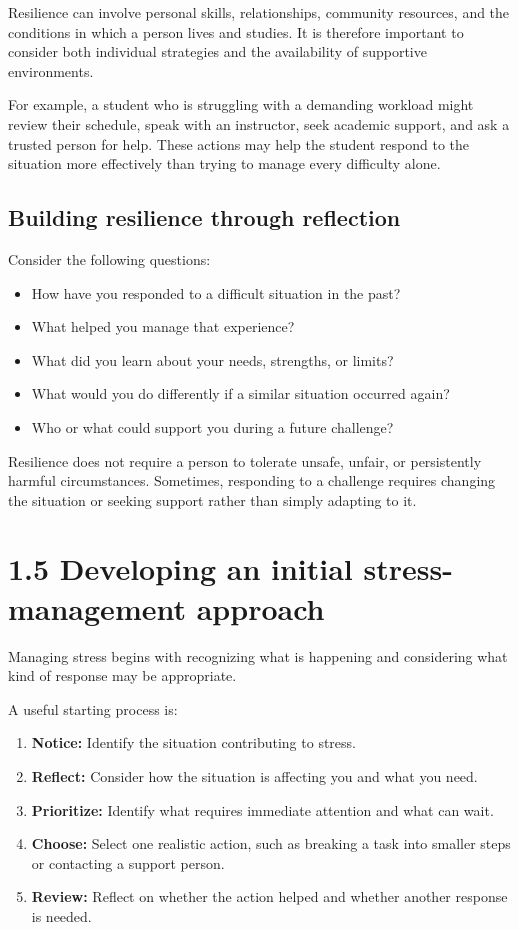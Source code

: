 \documentclass[
  letterpaper,
]{book}
\providecommand{\tightlist}{%
  \setlength{\itemsep}{0pt}\setlength{\parskip}{0pt}}
\begin{document}
Resilience can involve personal skills, relationships, community
resources, and the conditions in which a person lives and studies. It is
therefore important to consider both individual strategies and the
availability of supportive environments.

For example, a student who is struggling with a demanding workload might
review their schedule, speak with an instructor, seek academic support,
and ask a trusted person for help. These actions may help the student
respond to the situation more effectively than trying to manage every
difficulty alone.

\subsection{Building resilience through
reflection}\label{building-resilience-through-reflection}

Consider the following questions:

\begin{itemize}
\tightlist
\item
  How have you responded to a difficult situation in the past?
\item
  What helped you manage that experience?
\item
  What did you learn about your needs, strengths, or limits?
\item
  What would you do differently if a similar situation occurred again?
\item
  Who or what could support you during a future challenge?
\end{itemize}

Resilience does not require a person to tolerate unsafe, unfair, or
persistently harmful circumstances. Sometimes, responding to a challenge
requires changing the situation or seeking support rather than simply
adapting to it.

\section{1.5 Developing an initial stress-management
approach}\label{developing-an-initial-stress-management-approach}

Managing stress begins with recognizing what is happening and
considering what kind of response may be appropriate.

A useful starting process is:

\begin{enumerate}
\def\labelenumi{\arabic{enumi}.}
\tightlist
\item
  \textbf{Notice:} Identify the situation contributing to stress.
\item
  \textbf{Reflect:} Consider how the situation is affecting you and what
  you need.
\item
  \textbf{Prioritize:} Identify what requires immediate attention and
  what can wait.
\item
  \textbf{Choose:} Select one realistic action, such as breaking a task
  into smaller steps or contacting a support person.
\item
  \textbf{Review:} Reflect on whether the action helped and whether
  another response is needed.
\end{enumerate}
\end{document}
